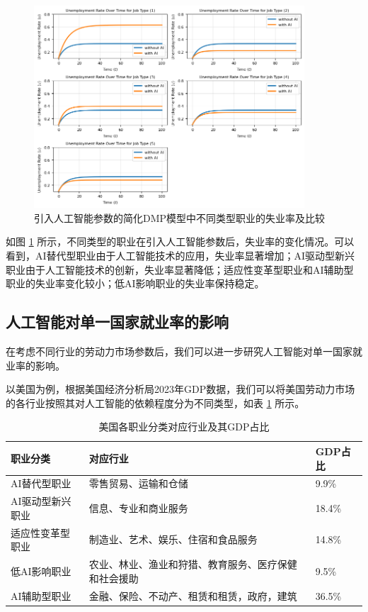 \documentclass{article}
\begin{document}
\begin{figure}[H]
    \centering
    \includegraphics[width=0.9\textwidth]{img/dmp_ai.png}
    \caption{引入人工智能参数的简化DMP模型中不同类型职业的失业率及比较}
    \label{fig:dmp_ai}
\end{figure}

如图 \ref{fig:dmp_ai} 所示，不同类型的职业在引入人工智能参数后，失业率的变化情况。可以看到，AI替代型职业由于人工智能技术的应用，失业率显著增加；AI驱动型新兴职业由于人工智能技术的创新，失业率显著降低；适应性变革型职业和AI辅助型职业的失业率变化较小；低AI影响职业的失业率保持稳定。

\subsection{人工智能对单一国家就业率的影响}

在考虑不同行业的劳动力市场参数后，我们可以进一步研究人工智能对单一国家就业率的影响。

以美国为例，根据美国经济分析局2023年GDP数据\cite{bea2023gdp}，我们可以将美国劳动力市场的各行业按照其对人工智能的依赖程度分为不同类型，如表 \ref{tab:gdp_classification} 所示。

\begin{table}[h!]
    \centering
    \begin{tabular}{p{5cm}p{6cm}p{2cm}}
    \toprule
    \textbf{职业分类} & \textbf{对应行业} & \textbf{GDP占比} \\
    \midrule
    AI替代型职业 & 零售贸易、运输和仓储 & 9.9\% \\
    AI驱动型新兴职业 & 信息、专业和商业服务 & 18.4\% \\
    适应性变革型职业 & 制造业、艺术、娱乐、住宿和食品服务 & 14.8\% \\
    低AI影响职业 & 农业、林业、渔业和狩猎、教育服务、医疗保健和社会援助 & 9.5\% \\
    AI辅助型职业 & 金融、保险、不动产、租赁和租赁，政府，建筑 & 36.5\% \\
    \bottomrule
    \end{tabular}
    \caption{美国各职业分类对应行业及其GDP占比}
    \label{tab:gdp_classification}
\end{table}
\end{document}
